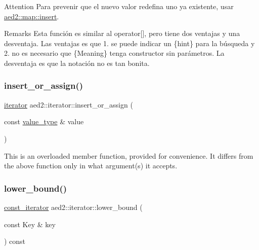 \begin{DoxyAttention}{Attention}
Para prevenir que el nuevo valor redefina uno ya existente, usar \hyperlink{classaed2_1_1map_a6941cde9a79c27f054b5c97a587a1854}{aed2\+::map\+::insert}. 
\end{DoxyAttention}
\begin{DoxyRemark}{Remarks}
Esta función es similar al operator\mbox{[}\mbox{]}, pero tiene dos ventajas y una desventaja. Las ventajas es que 1. se puede indicar un \{hint\} para la búsqueda y 2. no es necesario que \{Meaning\} tenga constructor sin parámetros. La desventaja es que la notación no es tan bonita. 
\end{DoxyRemark}
\mbox{\label{classaed2_1_1iterator_af131c4b0d89978372a0c8ce38bf8f33e}} 
\subsubsection{\texorpdfstring{insert\+\_\+or\+\_\+assign()}{insert\_or\_assign()}\hspace{0.1cm}{\footnotesize\ttfamily [2/2]}}
{\footnotesize\ttfamily \hyperlink{classaed2_1_1iterator_1_1iterator}{iterator} aed2\+::iterator\+::insert\+\_\+or\+\_\+assign (\begin{DoxyParamCaption}\item[{const \hyperlink{classaed2_1_1iterator_a6411a2c08b2b7c52f063bef1a168acb6}{value\+\_\+type} \&}]{value }\end{DoxyParamCaption})\hspace{0.3cm}{\ttfamily [inline]}}

This is an overloaded member function, provided for convenience. It differs from the above function only in what argument(s) it accepts. \mbox{\label{classaed2_1_1iterator_aa7366926b6328e4f2e80484944408cbc}} 
\subsubsection{\texorpdfstring{lower\+\_\+bound()}{lower\_bound()}\hspace{0.1cm}{\footnotesize\ttfamily [1/2]}}
{\footnotesize\ttfamily \hyperlink{classaed2_1_1iterator_1_1const__iterator}{const\+\_\+iterator} aed2\+::iterator\+::lower\+\_\+bound (\begin{DoxyParamCaption}\item[{const Key \&}]{key }\end{DoxyParamCaption}) const\hspace{0.3cm}{\ttfamily [inline]}}




